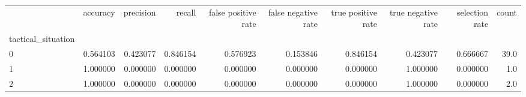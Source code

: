 \begin{tabular}{lrrrrrrrrr}
\toprule
{} &  accuracy &  precision &    recall &  false positive rate &  false negative rate &  true positive rate &  true negative rate &  selection rate &  count \\
tactical\_situation &           &            &           &                      &                      &                     &                     &                 &        \\
\midrule
0                  &  0.564103 &   0.423077 &  0.846154 &             0.576923 &             0.153846 &            0.846154 &            0.423077 &        0.666667 &   39.0 \\
1                  &  1.000000 &   0.000000 &  0.000000 &             0.000000 &             0.000000 &            0.000000 &            1.000000 &        0.000000 &    1.0 \\
2                  &  1.000000 &   0.000000 &  0.000000 &             0.000000 &             0.000000 &            0.000000 &            1.000000 &        0.000000 &    2.0 \\
\bottomrule
\end{tabular}
